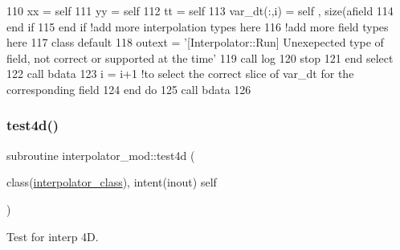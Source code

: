 \begin{DoxyCode}
110                     xx = self%
111                     yy = self%
112                     tt = self%
113                     var\_dt(:,i) = self%
      , \textcolor{keyword}{size}(afield%
114 \textcolor{keywordflow}{                end if}
115 \textcolor{keywordflow}{            end if} \textcolor{comment}{!add more interpolation types here}
116             \textcolor{comment}{!add more field types here}
117 \textcolor{keywordflow}{            class default}
118             outext = \textcolor{stringliteral}{'[Interpolator::Run] Unexepected type of field, not correct or supported at the time'}
119             \textcolor{keyword}{call }log%
120             stop
121 \textcolor{keywordflow}{        end select}
122         \textcolor{keyword}{call }bdata%
123         i = i+1 \textcolor{comment}{!to select the correct slice of var\_dt for the corresponding field}
124 \textcolor{keywordflow}{    end do}
125     \textcolor{keyword}{call }bdata%
126 
\end{DoxyCode}
\mbox{\label{namespaceinterpolator__mod_ac27ad06522b34071302dc09d10b0ec7e}} 
\subsubsection{\texorpdfstring{test4d()}{test4d()}}
{\footnotesize\ttfamily subroutine interpolator\+\_\+mod\+::test4d (\begin{DoxyParamCaption}\item[{class(\mbox{\hyperlink{structinterpolator__mod_1_1interpolator__class}{interpolator\+\_\+class}}), intent(inout)}]{self }\end{DoxyParamCaption})\hspace{0.3cm}{\ttfamily [private]}}



Test for interp 4D. 

